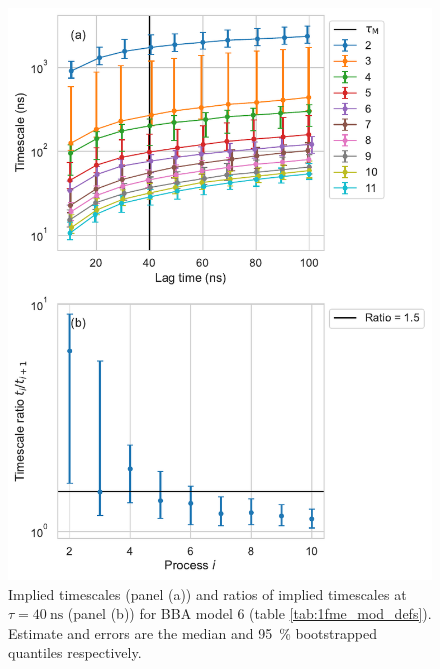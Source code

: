 \documentclass{article}
\begin{document}
\begin{figure}
    \centering
    \includegraphics[height=0.65\textheight]{figures/its/bba/BBA_model_logit(dist.)_method_m2.pdf}
    \caption{Implied timescales (panel (a)) and ratios of implied timescales at $\tau=\SI{40}{\nano\second}$ (panel (b)) for BBA model 6 (table \ref{tab:1fme_mod_defs}). Estimate and errors are the median and \SI{95}{\percent} bootstrapped quantiles respectively.}
    \label{fig:its_bba_6}
\end{figure}
\end{document}
